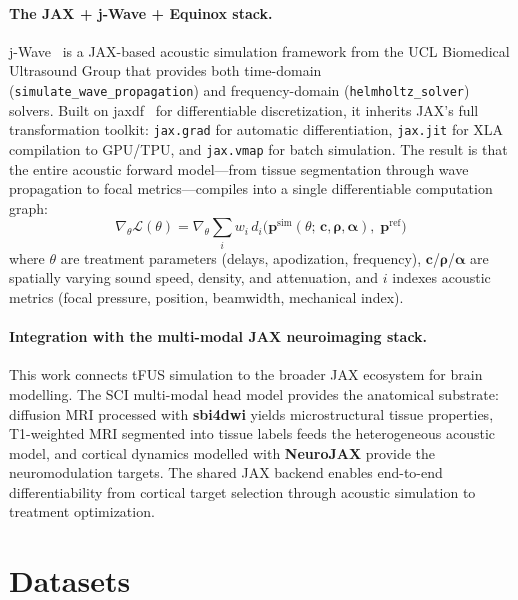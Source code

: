 \documentclass[11pt,a4paper]{article}\usepackage[]{graphicx}\usepackage[]{xcolor}
\begin{document}
\paragraph{The JAX + j-Wave + Equinox stack.}
j-Wave~\citep{Stanziola2023jwave} is a JAX-based acoustic simulation
framework from the UCL Biomedical Ultrasound Group that provides both
time-domain (\texttt{simulate\_wave\_propagation}) and frequency-domain
(\texttt{helmholtz\_solver}) solvers. Built on
jaxdf~\citep{Stanziola2022jaxdf} for differentiable discretization, it
inherits JAX's full transformation toolkit: \texttt{jax.grad} for
automatic differentiation, \texttt{jax.jit} for XLA compilation to
GPU/TPU, and \texttt{jax.vmap} for batch simulation. The result is that
the entire acoustic forward model---from tissue segmentation through
wave propagation to focal metrics---compiles into a single differentiable
computation graph:
%
\begin{equation}
  \nabla_\theta \mathcal{L}(\theta) = \nabla_\theta \sum_i w_i \, d_i\!\bigl(
    \mathbf{p}^{\text{sim}}(\theta;\, \mathbf{c}, \boldsymbol{\rho}, \boldsymbol{\alpha}),\;
    \mathbf{p}^{\text{ref}}
  \bigr)
  \label{eq:loss}
\end{equation}
%
where $\theta$ are treatment parameters (delays, apodization, frequency),
$\mathbf{c}$/$\boldsymbol{\rho}$/$\boldsymbol{\alpha}$ are spatially
varying sound speed, density, and attenuation, and $i$ indexes acoustic
metrics (focal pressure, position, beamwidth, mechanical index).

\paragraph{Integration with the multi-modal JAX neuroimaging stack.}
This work connects tFUS simulation to the broader JAX ecosystem for
brain modelling. The SCI multi-modal head model provides the anatomical
substrate: diffusion MRI processed with \textbf{sbi4dwi} yields
microstructural tissue properties, T1-weighted MRI segmented into tissue
labels feeds the heterogeneous acoustic model, and cortical dynamics
modelled with \textbf{NeuroJAX} provide the neuromodulation targets. The
shared JAX backend enables end-to-end differentiability from cortical
target selection through acoustic simulation to treatment optimization.

\section{Datasets}
\label{sec:datasets}
\end{document}
